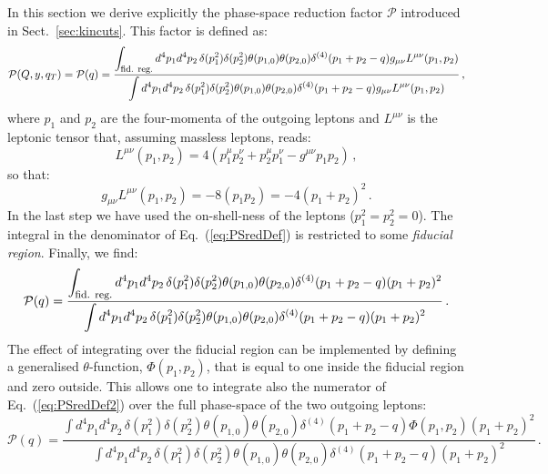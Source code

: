 \documentclass[10pt,a4paper]{article}
\begin{document}
In this section we derive explicitly the phase-space reduction factor
$\mathcal{P}$ introduced in Sect.~\ref{sec:kincuts}. This factor is
defined as:
\begin{equation}\label{eq:PSredDef}
\mathcal{P}(Q,y,q_T) = \mathcal{P}(q) = \frac{\displaystyle \int_{\mbox{\footnotesize fid.
    reg.}}d^4p_1 d^4p_2 \,\delta(p_1^2) \delta(p_2^2)\theta(p_{1,0}) \theta(p_{2,0})\delta^{(4)}(p_1+p_2-q) g_{\mu\nu}L^{\mu\nu}(p_1,p_2)}{\displaystyle \int d^4p_1 d^4p_2\, \delta(p_1^2) \delta(p_2^2) \theta(p_{1,0}) \theta(p_{2,0})\delta^{(4)}(p_1+p_2-q) g_{\mu\nu}L^{\mu\nu}(p_1,p_2)}\,,
\end{equation}
where $p_1$ and $p_2$ are the four-momenta of the outgoing leptons
and $L^{\mu\nu}$ is the leptonic tensor that, assuming massless
leptons, reads:
\begin{equation}\label{eq:lepttens}
L^{\mu\nu}(p_1,p_2) = 4(p_1^{\mu}p_2^{\nu}+p_2^{\mu}p_1^{\nu}-g^{\mu\nu}p_1p_2)\,,
\end{equation}
so that:
\begin{equation}
g_{\mu\nu}L^{\mu\nu}(p_1,p_2) = -8(p_1p_2) = -4(p_1+p_2)^2\,.
\end{equation}
In the last step we have used the on-shell-ness of the leptons
($p_1^2=p_2^2=0$). The integral in the denominator of
Eq.~(\ref{eq:PSredDef}) is restricted to some \textit{fiducial
  region}. Finally, we find:
\begin{equation}\label{eq:PSredDef2}
\mathcal{P}(q) = \frac{\displaystyle \int_{\mbox{\footnotesize fid.
    reg.}}d^4p_1 d^4p_2 \,\delta(p_1^2) \delta(p_2^2) \theta(p_{1,0}) \theta(p_{2,0})\delta^{(4)}(p_1+p_2-q) (p_1+p_2)^2}{\displaystyle \int d^4p_1 d^4p_2\, \delta(p_1^2) \delta(p_2^2) \theta(p_{1,0}) \theta(p_{2,0})\delta^{(4)}(p_1+p_2-q) (p_1+p_2)^2}\,.
\end{equation}
The effect of integrating over the fiducial region can be implemented
by defining a generalised $\theta$-function, $\Phi(p_1,p_2)$, that is
equal to one inside the fiducial region and zero outside. This allows
one to integrate also the numerator of Eq.~(\ref{eq:PSredDef2}) over
the full phase-space of the two outgoing leptons:
\begin{equation}\label{eq:PSredDef3}
\mathcal{P}(q) = \frac{\displaystyle \int d^4p_1 d^4p_2 \,\delta(p_1^2) \delta(p_2^2) \theta(p_{1,0}) \theta(p_{2,0})\delta^{(4)}(p_1+p_2-q) \Phi(p_1,p_2) (p_1+p_2)^2}{\displaystyle \int d^4p_1 d^4p_2\, \delta(p_1^2) \delta(p_2^2) \theta(p_{1,0}) \theta(p_{2,0})\delta^{(4)}(p_1+p_2-q) (p_1+p_2)^2}\,.
\end{equation}
\end{document}
